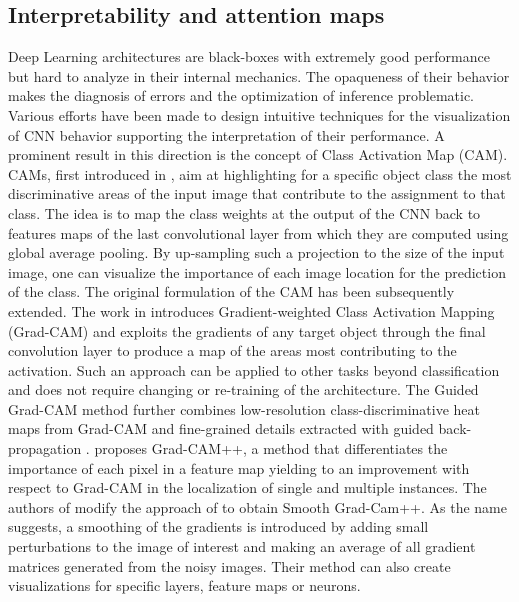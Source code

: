 \documentclass[acmlarge]{acmart}
\begin{document}
\subsection{Interpretability and attention maps}


Deep Learning architectures are  black-boxes with extremely good performance but hard to analyze in their internal mechanics.  The opaqueness of their behavior makes the diagnosis of errors and the optimization of inference problematic. Various efforts have been made to design intuitive  techniques for the visualization of CNN behavior supporting the  interpretation of their performance. A prominent result in this direction is the concept of Class Activation Map (CAM). CAMs,  first introduced in \cite{zhou2016learning},  aim at highlighting for a specific object class the most discriminative areas of the input image that contribute to the assignment to that class. The idea is to map the  class weights at the output of the CNN back to features maps of the last convolutional layer from which they are computed using global average pooling. By up-sampling such a projection to the size of the input image, one can visualize the importance of each image location for the prediction of the class.  
The original  formulation of the CAM has been subsequently extended. The work in \cite{selvaraju2017grad} introduces Gradient-weighted Class Activation Mapping (Grad-CAM) and exploits the gradients of any target object through the final convolution layer to produce a map of the areas most contributing to the activation. Such an  approach  can be applied to other tasks beyond classification and does not require changing or re-training of the architecture. The Guided Grad-CAM  method  further combines low-resolution class-discriminative heat maps from Grad-CAM and fine-grained details extracted with guided back-propagation \cite{springenberg2014striving}.  \cite{chattopadhay2018grad} proposes Grad-CAM++, a method that differentiates the importance of each pixel in a feature map yielding to an improvement with respect to Grad-CAM in the localization of single and multiple instances. The authors of \cite{omeiza2019smooth} modify the approach of \cite{chattopadhay2018grad} to obtain Smooth Grad-Cam++. As the name suggests, a smoothing   of the gradients is introduced  by adding small perturbations to the image of interest and making an average of all gradient matrices generated from the noisy images. Their method can also   create visualizations for specific layers, feature maps or neurons. 
\end{document}
